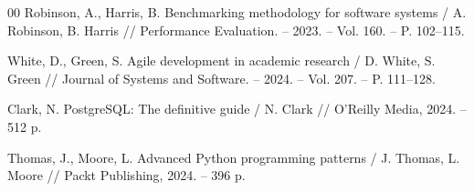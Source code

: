 \begin{thebibliography}{00}
    Robinson, A., Harris, B.
    Benchmarking methodology for software systems /
    A. Robinson, B. Harris //
    Performance Evaluation. -- 2023. -- Vol. 160. -- P. 102--115.

    White, D., Green, S.
    Agile development in academic research /
    D. White, S. Green //
    Journal of Systems and Software. -- 2024. -- Vol. 207. -- P. 111--128.

    Clark, N.
    PostgreSQL: The definitive guide /
    N. Clark //
    O'Reilly Media, 2024. -- 512 p.

    Thomas, J., Moore, L.
    Advanced Python programming patterns /
    J. Thomas, L. Moore //
    Packt Publishing, 2024. -- 396 p.

\end{thebibliography}
\endgroup
